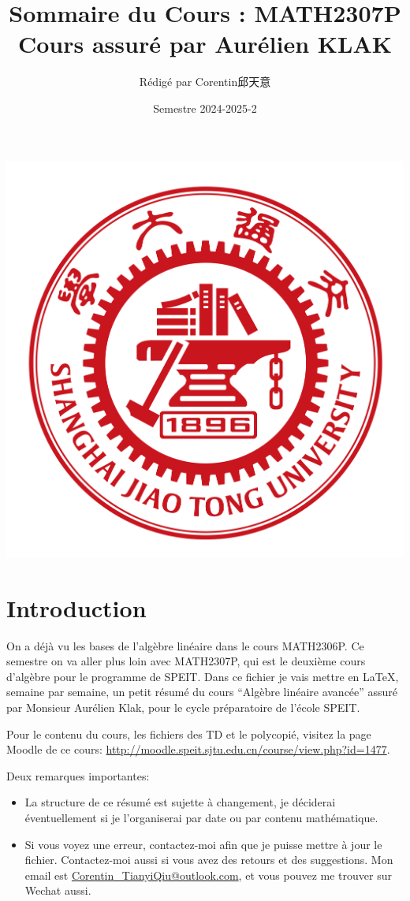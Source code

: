 \documentclass{article}
\title{\textbf{Sommaire du Cours : MATH2307P} \\ Cours assuré par Aurélien KLAK}
\author{Rédigé par Corentin邱天意}
\date{Semestre 2024-2025-2}
\begin{document}
\maketitle

\centerline{\includegraphics[scale=0.4]{sjtu}}

\newpage

\section*{Introduction}

On a déjà vu les bases de l'algèbre linéaire dans le cours MATH2306P. Ce semestre on va aller plus loin avec MATH2307P, qui est le deuxième cours d'algèbre pour le programme de SPEIT. Dans ce fichier je vais mettre en \LaTeX , semaine par semaine, un petit résumé du cours ``Algèbre linéaire avancée'' assuré par Monsieur Aurélien Klak, pour le cycle préparatoire de l'école SPEIT.

Pour le contenu du cours, les fichiers des TD et le polycopié, visitez la page Moodle de ce cours: \url{http://moodle.speit.sjtu.edu.cn/course/view.php?id=1477}.

Deux remarques importantes:

\begin{itemize}

\item La structure de ce résumé est sujette à changement, je déciderai éventuellement si je l'organiserai par date ou par contenu mathématique.
\item Si vous voyez une erreur, contactez-moi afin que je puisse mettre à jour le fichier. Contactez-moi aussi si vous avez des retours et des suggestions. Mon email est \url{Corentin\_TianyiQiu@outlook.com}, et vous pouvez me trouver sur Wechat aussi.

\end{itemize}
\end{document}
